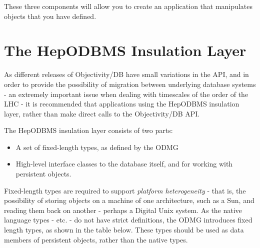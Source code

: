 \par

These three components will allow you to create an application that manipulates 
objects that you have defined.
\section{The HepODBMS Insulation Layer}

\par

As different releases of Objectivity/DB have small variations in the API, and in order
to provide the possibility of migration between underlying database systems -
an extremely important issue when dealing with timescales of the order of the LHC - 
it is  recommended that applications using the HepODBMS
insulation layer, rather than make direct calls to the Objectivity/DB API.

\par

The HepODBMS insulation layer consists of two parts:

\begin{itemize}

\item A set of fixed-length types, as defined by the ODMG
\item High-level interface classes to the database itself, and for
working with persistent objects.\end{itemize}

\par

Fixed-length types are required to support \emph{platform heterogeneity} - that is,
the possibility of storing objects on a machine of one architecture, such as
a Sun, and reading them back on another - perhaps a Digital Unix system.
As the native language types -  etc. - do not have
strict definitions, the ODMG introduces fixed length types, as shown
in the table below. These types should  be used as
data members of persistent objects, rather than the native types.

